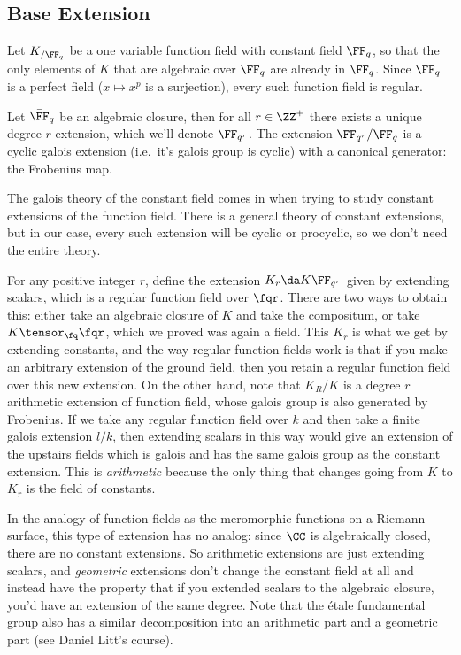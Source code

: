 \hypertarget{base-extension-1}{%
\subsection{Base Extension}\label{base-extension-1}}

Let \(K_{/\FF_q}\) be a one variable function field with constant field
\(\FF_q\), so that the only elements of \(K\) that are algebraic over
\(\FF_q\) are already in \(\FF_q\). Since \(\FF_q\) is a perfect field
(\(x\mapsto x^p\) is a surjection), every such function field is
regular.

Let \(\bar{\FF}_q\) be an algebraic closure, then for all \(r\in \ZZ^+\)
there exists a unique degree \(r\) extension, which we'll denote
\(\FF_{q^r}\). The extension \(\FF_{q^r}/\FF_q\) is a cyclic galois
extension (i.e.~it's galois group is cyclic) with a canonical generator:
the Frobenius map.

The galois theory of the constant field comes in when trying to study
constant extensions of the function field. There is a general theory of
constant extensions, but in our case, every such extension will be
cyclic or procyclic, so we don't need the entire theory.

For any positive integer \(r\), define the extension
\(K_r \da K \FF_{q^r}\) given by extending scalars, which is a regular
function field over \(\fqr\). There are two ways to obtain this: either
take an algebraic closure of \(K\) and take the compositum, or take
\(K\tensor_{\fq}\fqr\), which we proved was again a field. This \(K_r\)
is what we get by extending constants, and the way regular function
fields work is that if you make an arbitrary extension of the ground
field, then you retain a regular function field over this new extension.
On the other hand, note that \(K_R/K\) is a degree \(r\) arithmetic
extension of function field, whose galois group is also generated by
Frobenius. If we take any regular function field over \(k\) and then
take a finite galois extension \(l/k\), then extending scalars in this
way would give an extension of the upstairs fields which is galois and
has the same galois group as the constant extension. This is
\emph{arithmetic} because the only thing that changes going from \(K\)
to \(K_r\) is the field of constants.

In the analogy of function fields as the meromorphic functions on a
Riemann surface, this type of extension has no analog: since \(\CC\) is
algebraically closed, there are no constant extensions. So arithmetic
extensions are just extending scalars, and \emph{geometric} extensions
don't change the constant field at all and instead have the property
that if you extended scalars to the algebraic closure, you'd have an
extension of the same degree. Note that the étale fundamental group also
has a similar decomposition into an arithmetic part and a geometric part
(see Daniel Litt's course).

